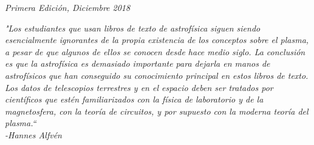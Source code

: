 \noindent \textit{Primera Edición, Diciembre 2018} %
\newpage
~\vfill
\thispagestyle{empty}
\noindent \begin{flushright}
\emph{"Los estudiantes que usan libros de texto de astrofísica siguen siendo esencialmente ignorantes de la propia existencia de los conceptos sobre el plasma, a pesar de que algunos de ellos se conocen desde hace medio siglo. La conclusión es que la astrofísica es demasiado importante para dejarla en manos de astrofísicos que han conseguido su conocimiento principal en estos libros de texto. Los datos de telescopios terrestres y en el espacio deben ser tratados por científicos que estén familiarizados con la física de laboratorio y de la magnetosfera, con la teoría de circuitos, y por supuesto con la moderna teoría del plasma.“\\
\vspace{3mm}
-Hannes Alfvén}
\end{flushright}



\pagestyle{empty} %
\renewcommand\contentsname{Contenido}
\tableofcontents %


\pagestyle{fancy} %
